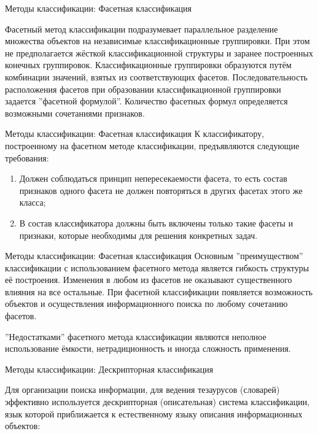 \documentclass{beamer}
\begin{document}
\begin{frame}{Методы классификации: Фасетная классификация}

Фасетный метод классификации подразумевает параллельное разделение множества объектов на независимые 
классификационные группировки. При этом не предполагается жёсткой классификационной структуры и заранее построенных конечных группировок. 
Классификационные группировки образуются путём комбинации значений, взятых из соответствующих фасетов.
 Последовательность расположения фасетов при образовании классификационной группировки задается ''фасетной формулой''.
  Количество фасетных формул определяется возможными сочетаниями признаков.
\end{frame}

\begin{frame}{Методы классификации: Фасетная классификация} 
К классификатору, построенному на фасетном методе классификации, предъявляются следующие требования:
\begin{enumerate}
  \item Должен соблюдаться принцип непересекаемости фасета, то есть состав признаков одного фасета не должен повторяться в других фасетах этого же класса;
  \item В состав классификатора должны быть включены только такие фасеты и признаки, которые необходимы для решения конкретных задач.
\end{enumerate}

\end{frame}

\begin{frame}{Методы классификации: Фасетная классификация} 
Основным ''преимуществом'' классификации с использованием фасетного метода является гибкость структуры её построения.
 Изменения в любом из фасетов не оказывают существенного влияния на все остальные. 
При фасетной классификации появляется возможность объектов и осуществления
 информационного поиска по любому сочетанию фасетов.

''Недостатками'' фасетного метода классификации являются неполное использование 
ёмкости, нетрадиционность и иногда сложность применения.


\end{frame}


\begin{frame}{Методы классификации: Дескрипторная классификация}

Для организации поиска информации, для ведения тезаурусов (словарей) эффективно используется дескрипторная (описательная) система классификации,
 язык которой приближается к естественному языку описания информационных объектов:   
\end{frame}
 
\end{document}
